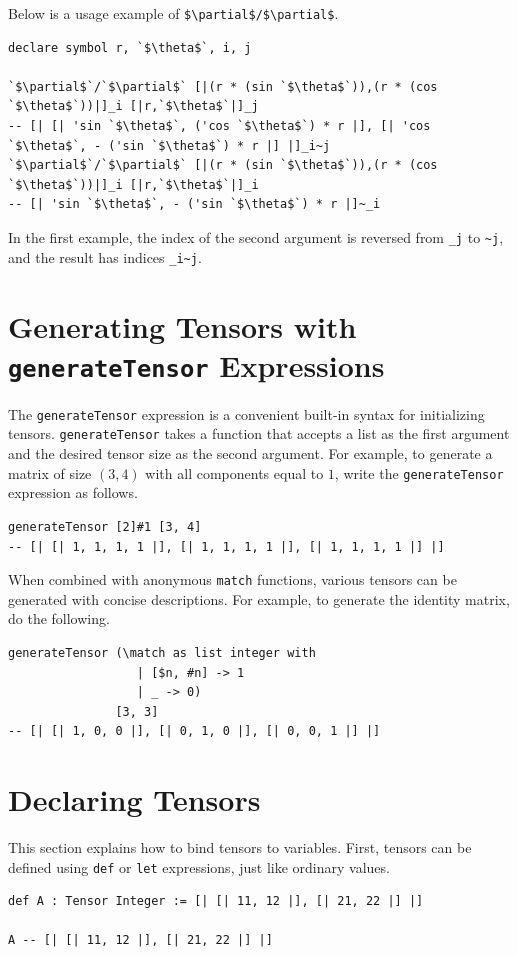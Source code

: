 Below is a usage example of \lstinline[mathescape]!$\partial$/$\partial$!.
\begin{lstlisting}[language=egison,numbers=none]
declare symbol r, `$\theta$`, i, j

`$\partial$`/`$\partial$` [|(r * (sin `$\theta$`)),(r * (cos `$\theta$`))|]_i [|r,`$\theta$`|]_j
-- [| [| 'sin `$\theta$`, ('cos `$\theta$`) * r |], [| 'cos `$\theta$`, - ('sin `$\theta$`) * r |] |]_i~j
`$\partial$`/`$\partial$` [|(r * (sin `$\theta$`)),(r * (cos `$\theta$`))|]_i [|r,`$\theta$`|]_i
-- [| 'sin `$\theta$`, - ('sin `$\theta$`) * r |]~_i
\end{lstlisting}

In the first example, the index of the second argument is reversed from \lstinline{_j} to \lstinline{~j}, and the result has indices \lstinline{_i~j}.

\section{Generating Tensors with \texttt{generateTensor} Expressions}

The \lstinline{generateTensor} expression is a convenient built-in syntax for initializing tensors.
\lstinline{generateTensor} takes a function that accepts a list as the first argument and the desired tensor size as the second argument.
For example, to generate a matrix of size $(3, 4)$ with all components equal to $1$, write the \lstinline{generateTensor} expression as follows.
\begin{lstlisting}[language=egison,numbers=none]
generateTensor [2]#1 [3, 4]
-- [| [| 1, 1, 1, 1 |], [| 1, 1, 1, 1 |], [| 1, 1, 1, 1 |] |]
\end{lstlisting}

When combined with anonymous \lstinline{match} functions, various tensors can be generated with concise descriptions.
For example, to generate the identity matrix, do the following.
\begin{lstlisting}[language=egison,numbers=none]
generateTensor (\match as list integer with
                  | [$n, #n] -> 1
                  | _ -> 0)
               [3, 3]
-- [| [| 1, 0, 0 |], [| 0, 1, 0 |], [| 0, 0, 1 |] |]
\end{lstlisting}

\section{Declaring Tensors}

This section explains how to bind tensors to variables.
First, tensors can be defined using \lstinline{def} or \lstinline{let} expressions, just like ordinary values.
\begin{lstlisting}[language=egison,numbers=none]
def A : Tensor Integer := [| [| 11, 12 |], [| 21, 22 |] |]

A -- [| [| 11, 12 |], [| 21, 22 |] |]
\end{lstlisting}

